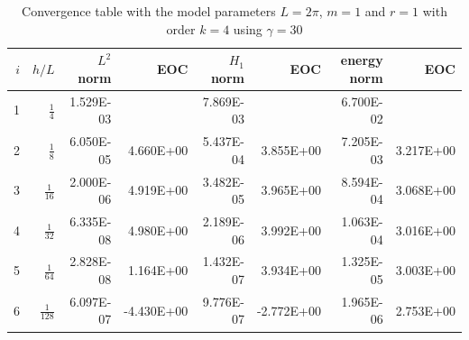 \begin{table}
  \caption{\label{tab:ex2_order:c} Convergence table with the model parameters $L=2\pi$, $m=1$ and $r=1$ with order $k=4$ using $ \gamma = 30$}
  \begin{tabular}{rrrrrrrr}
    \hline\hline
    $i$&\textbf{$h/{L} $} & \textbf{$L^2$ norm} & \textbf{EOC} & \textbf{$H_1$ norm} & \textbf{EOC} & \textbf{energy norm} & \textbf{EOC} \\\hline
    1&$\frac{1}{4}$ & 1.529E-03 &  & 7.869E-03 &  & 6.700E-02 &  \\
    2&$\frac{1}{8}$ & 6.050E-05 & 4.660E+00 & 5.437E-04 & 3.855E+00 & 7.205E-03 & 3.217E+00 \\
    3&$\frac{1}{16}$ & 2.000E-06 & 4.919E+00 & 3.482E-05 & 3.965E+00 & 8.594E-04 & 3.068E+00 \\
    4&$\frac{1}{32}$ & 6.335E-08 & 4.980E+00 & 2.189E-06 & 3.992E+00 & 1.063E-04 & 3.016E+00 \\
    5&$\frac{1}{64}$ & 2.828E-08 & 1.164E+00 & 1.432E-07 & 3.934E+00 & 1.325E-05 & 3.003E+00 \\
    6&$\frac{1}{128}$ & 6.097E-07 & -4.430E+00 & 9.776E-07 & -2.772E+00 & 1.965E-06 & 2.753E+00 \\\hline\hline
  \end{tabular}
\end{table}


